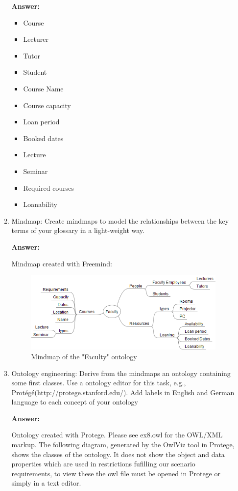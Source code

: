 \documentclass[10pt,a4paper]{article}
\begin{document}
\begin{enumerate}
\begin{enumerate}
\textbf{Answer:}

\begin{itemize}
\item Course
\item Lecturer
\item Tutor
\item Student
\item Course Name
\item Course capacity
\item Loan period
\item Booked dates
\item Lecture 
\item Seminar
\item Required courses
\item Loanability
\end{itemize}

\item Mindmap: Create mindmaps to model the relationships between the key terms of your glossary in a light-weight way.

\textbf{Answer:}

Mindmap created with Freemind:

\begin{figure}[H]
  \caption{Mindmap of the "Faculty" ontology}
  \centering
    \includegraphics[scale=0.7]{Faculty_mindmap.png}
\end{figure}

\item Ontology engineering: Derive from the mindmaps an ontology containing some first classes. Use a ontology editor for this task, e.g., Protégé(http://protege.stanford.edu/). Add labels in English and German language to each concept of your ontology

\textbf{Answer:}

Ontology created with Protege. Please see ex8.owl for the OWL/XML markup. The following diagram, generated by the OwlViz tool in Protege, shows the classes of the ontology. It does not show the object and data properties which are used in restrictions fufilling our scenario requirements, to view these the owl file must be opened in Protege or simply in a text editor.


\end{enumerate}
\end{enumerate}
\end{document}
